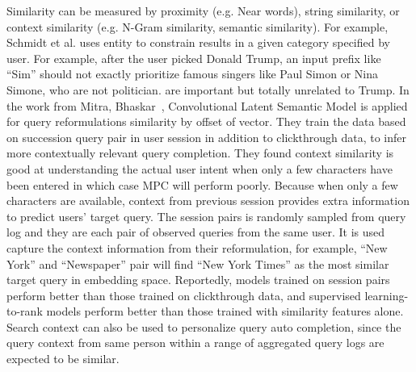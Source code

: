 \documentclass[12pt]{article} %
\begin{document}
Similarity can be measured by proximity (e.g. Near words), string similarity, or context similarity (e.g. N-Gram similarity, semantic similarity).
For example, Schmidt et al. \cite{schmidt_context_sensitive_2016} uses entity to constrain results in a given category specified by user. 
For example, after the user picked Donald Trump, an input prefix like “Sim” should not exactly prioritize famous singers like Paul Simon or Nina Simone, who are not politician.
are important but totally unrelated to Trump. 
In the work from Mitra, Bhaskar~\cite{mitra_exploring_2015}, Convolutional Latent Semantic Model is applied for query reformulations similarity by offset of vector.
They train the data based on succession query pair in user session in addition to clickthrough data,
to infer more contextually relevant query completion.
They found context similarity is good at understanding the actual user intent when only a few characters have been entered in which case MPC will perform poorly.
Because when only a few characters are available, context from previous session provides extra information to predict users' target query.
The session pairs is randomly sampled from query log and they are each pair of observed queries from the same user.
It is used capture the context information from their reformulation, for example, ``New York'' and ``Newspaper'' pair will find ``New York Times'' as the most similar target query in embedding space. 
Reportedly, models trained on session pairs perform better than those trained on clickthrough data, and supervised learning-to-rank models perform better than
those trained with similarity features alone.
Search context can also be used to personalize query auto completion, since the query context from same person within a range of aggregated query logs are expected to be similar.
\end{document}
